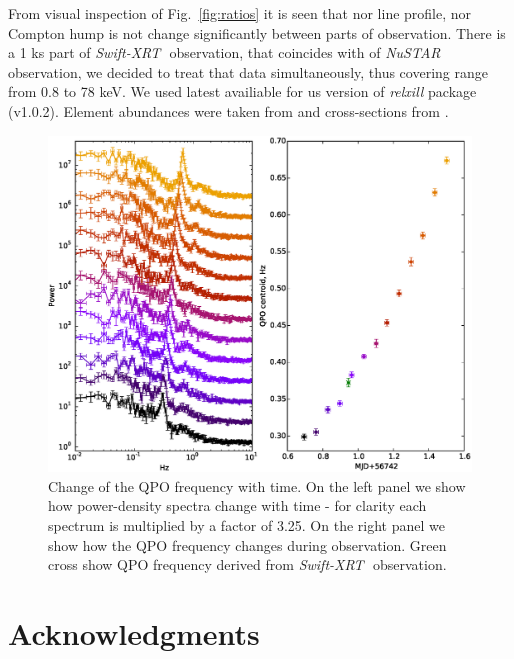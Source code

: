 \documentclass[a4paper,fleqn,usenatbib]{mnras}
\def\swiftx{{\em Swift-XRT\,}}
\def\nustar{{\em NuSTAR\,}}
\begin{document}
From visual inspection of Fig.~\ref{fig:ratios} it is seen that nor line profile, nor Compton hump is not change significantly between parts of observation. There is a 1 ks part of \swiftx\, observation, that coincides with of \nustar\, observation, we decided to treat that data simultaneously, thus covering range from 0.8 to 78 keV. We used latest availiable for us version of {\it relxill} package (v1.0.2). Element abundances were taken from \cite{wilms00} and cross-sections from \cite{verner96}.


 
\begin{figure}
\centerline{\includegraphics[scale=0.7]{QPOdrift_v02.eps}}
\caption{Change of the QPO frequency with time. On the left panel we show how power-density spectra change with time - for clarity each spectrum is multiplied by a factor of 3.25. On the right panel we show how the QPO frequency changes during observation. Green cross show QPO frequency derived from \swiftx\, observation.} 
\label{fig:qpodrift}
\end{figure}  


\section*{Acknowledgments}



\bsp	
\label{lastpage}
\end{document}

